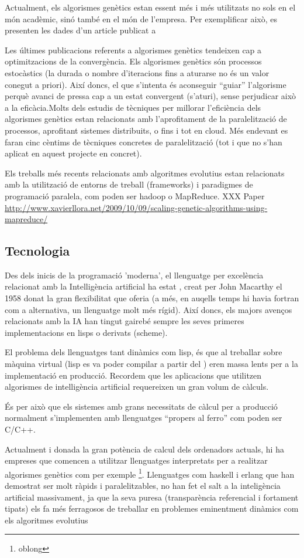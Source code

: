 Actualment, els algorismes genètics estan essent més i més utilitzats no sols en
el món acadèmic, sinó també en el món de l'empresa.  Per exemplificar això, es
presenten les dades d'un article publicat a 

Les últimes publicacions referents a algorismes genètics tendeixen cap a
optimitzacions de la convergència.  Els algorismes genètics són processos
estocàstics (la durada o nombre d'iteracions fins a aturarse no és un valor
conegut a priori).  Així doncs, el que s'intenta és aconseguir ``guiar''
l'algorisme perquè avanci de pressa cap a un estat convergent (s'aturi), sense
perjudicar això a la eficàcia.Molts dels estudis de tècniques per millorar
l'eficiència dels algorismes genètics estan relacionats amb l'aprofitament de la
paralelització de processos, aprofitant sistemes distribuits, o fins i tot en
cloud.  Més endevant es faran cinc cèntims de tècniques concretes de
paralelització (tot i que no s'han aplicat en aquest projecte en concret).

Els treballs més recents relacionats amb algoritmes evolutius estan relacionats
amb la utilització de entorns de treball (frameworks) i paradigmes de
programació paralela, com poden ser hadoop o MapReduce. XXX Paper 
\url{http://www.xavierllora.net/2009/10/09/scaling-genetic-algorithms-using-mapreduce/}

\subsection{Tecnologia} %
\label{sub:Tecnologia}

Des dels inicis de la programació 'moderna', el llenguatge per excelència
relacionat amb la Intelligència artificial ha estat \cite{LISP}, creat per John
Macarthy el 1958 donat la gran flexibilitat que oferia (a més, en auqells temps
hi havia fortran com a alternativa, un llenguatge molt més rígid).  Així doncs,
els majors avenços relacionats amb la IA han tingut gairebé sempre les seves
primeres implementacions en lisps o derivats (scheme).  

El problema dels llenguatges tant dinàmics com lisp, és que al treballar sobre
màquina virtual (lisp es va poder compilar a partir del %
) eren massa lents per a la implementació en producció.  Recordem que les
aplicacions que utilitzen algorismes de intelligència artificial requereixen un
gran volum de càlculs.

És per això que els sistemes amb grans necessitats de càlcul per a producció
normalment s'implementen amb llenguatges ``propers al ferro'' com poden ser
C/C++. 

Actualment i donada la gran potència de calcul dels ordenadors actuals, hi ha
empreses que comencen a utilitzar llenguatges interpretats per a realitzar
algorismes genètics  com per exemple \footnote{oblong}.  Llenguatges com haskell
i erlang que han demostrat ser molt ràpids i paralelitzables, no han fet el salt
a la inteligència artificial massivament, ja que la seva puresa (transparència
referencial i fortament tipats) els fa més ferragosos de treballar en problemes
eminentment dinàmics com els algoritmes evolutius  


%
